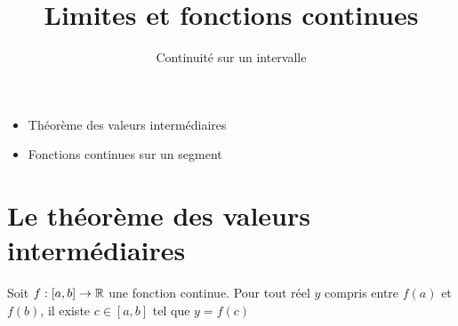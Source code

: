 








\title{{\bf Limites et fonctions continues}}
\subtitle{Continuité sur un intervalle}

\begin{frame}
  
  \debutmontitre

  \pause

{\footnotesize
\hfill
{}
\begin{minipage}{0.6\textwidth}
  \begin{itemize}
    \item<3-> Théorème des valeurs intermédiaires
    \item<4-> Fonctions continues sur un segment
  \end{itemize}
\end{minipage}
}

\end{frame}

\setcounter{framenumber}{0}


\section{Le théorème des valeurs intermédiaires}

\begin{frame}
\begin{theoreme}
Soit $f:[a,b]\to\mathbb{R}$ une fonction continue. 
Pour tout réel $y$ compris entre $f(a)$ et $f(b)$, il existe $c\in[a,b]$ tel que $y=f(c)$
\end{theoreme}

\pause
{}
  
\end{frame}



